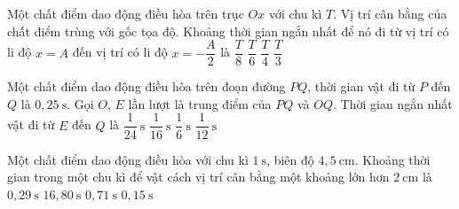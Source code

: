 \begin{ex}
Một chất điểm dao động điều hòa trên trục $Ox$ với chu kì $T$. Vị trí cân bằng của chất điểm trùng với gốc tọa độ. Khoảng thời gian ngắn nhất để nó đi từ vị trí có li độ $x=A$ đến vị trí có li độ $x=-\dfrac{A}{2}$ là
\choice
{$\dfrac{T}{8}$}
{$\dfrac{T}{6}$}
{$\dfrac{T}{4}$}
{\True $\dfrac{T}{3}$}
\end{ex}

\begin{ex}
Một chất điểm dao động điều hòa trên đoạn đường $PQ$, thời gian vật đi từ $P$ đến $Q$ là $0,25\ \text{s}$. Gọi $O$, $E$ lần lượt là trung điểm của $PQ$ và $OQ$. Thời gian ngắn nhất vật đi từ $E$ đến $Q$ là
\choice
{$\dfrac{1}{24}\ \text{s}$}
{$\dfrac{1}{16}\ \text{s}$}
{$\dfrac{1}{6}\ \text{s}$}
{\True $\dfrac{1}{12}\ \text{s}$}
\end{ex}

\begin{ex}
Một chất điểm dao động điều hòa với chu kì $1\ \text{s}$, biên độ $4,5\ \text{cm}$. Khoảng thời gian trong một chu kì để vật cách vị trí cân bằng một khoảng lớn hơn $2\ \text{cm}$ là
\choice
{$0,29\ \text{s}$}
{$16,80\ \text{s}$}
{\True $0,71\ \text{s}$}
{$0,15\ \text{s}$}
\end{ex}

